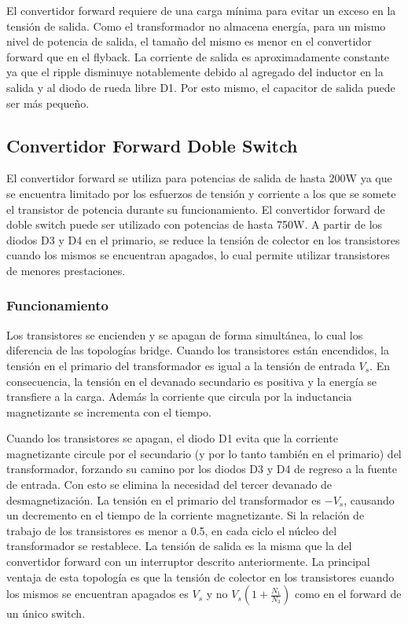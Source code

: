 El convertidor forward requiere de una carga mínima para evitar un exceso en la tensión de salida. 
Como el transformador no almacena energía, para un mismo nivel de potencia de salida, 
el tamaño del mismo es menor en el convertidor forward que en el flyback. 
La corriente de salida es aproximadamente constante ya que el ripple disminuye notablemente 
debido al agregado del inductor en la salida y al diodo de rueda libre D1.
Por esto mismo, el capacitor de salida puede ser más pequeño. 

\subsection{Convertidor Forward Doble Switch}

El convertidor forward se utiliza para potencias de salida de hasta 200W ya que se encuentra limitado 
por los esfuerzos de tensión y corriente a los que se somete el transistor de potencia durante su funcionamiento. 
El convertidor forward de doble switch puede ser utilizado con potencias de hasta 750W. 
A partir de los diodos D3 y D4 en el primario, se reduce la tensión de colector en los transistores cuando los mismos 
se encuentran apagados, lo cual permite utilizar transistores de menores prestaciones.

\subsubsection{Funcionamiento}

Los transistores se encienden y se apagan de forma simultánea, lo cual los diferencia de las topologías bridge. 
Cuando los transistores están encendidos, la tensión en el primario del transformador es igual a la tensión de entrada $V_s$. 
En consecuencia, la tensión en el devanado secundario es positiva y la energía se transfiere a la carga. 
Además la corriente que circula por la inductancia magnetizante se incrementa con el tiempo. 

Cuando los transistores se apagan, el diodo D1 evita que la corriente magnetizante circule por el secundario 
(y por lo tanto también en el primario) del transformador, forzando su camino por los diodos D3 y D4 de regreso a la fuente de entrada.  
Con esto se elimina la necesidad del tercer devanado de desmagnetización. 
La tensión en el primario del transformador es $-V_s$, causando un decremento en el tiempo de la corriente magnetizante. 
Si la relación de trabajo de los transistores es menor a 0.5, en cada ciclo el núcleo del transformador se restablece.
La tensión de salida es la misma que la del convertidor forward con un interruptor descrito anteriormente.
La principal ventaja de esta topología es que la tensión de colector en los transistores cuando los mismos se encuentran apagados 
es $V_s$ y no $V_s\left(1+\frac{N_1}{N_3}\right)$ como en el forward de un único switch.

